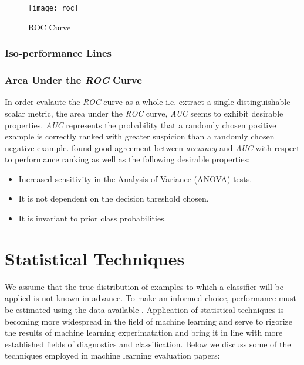 \documentclass[12pt]{unbthesis}
\begin{document}
\begin{figure}
  \begin{center}
	\texttt{[image: roc]}
  \end{center}
  \caption{ROC Curve}
  \label{fig:roc}
\end{figure} 


\subsubsection{Iso-performance Lines}

\subsubsection{Area Under the \textit{ROC} Curve}
In order evalaute the \textit{ROC} curve as a whole i.e. extract a
single distinguishable scalar metric, the area under the \textit{ROC}
curve, \textit{AUC} seems to exhibit desirable
properties. \textit{AUC} represents the probability that a randomly
chosen positive example is correctly ranked with greater suspicion
than a randomly chosen negative example. \cite{Refworks:32} found good
agreement between \textit{accuracy} and \textit{AUC} with respect to
performance ranking as well as the following desirable properties:

\begin{itemize}
\item Increased sensitivity in the Analysis of Variance (ANOVA) tests.
\item It is not dependent on the decision threshold chosen.
\item It is invariant to prior class probabilities.
\end{itemize}

\section{Statistical Techniques}
We assume that the true distribution of examples to which a classifier
will be applied is not known in advance. To make an informed choice,
performance must be estimated using the data available
\cite{RefWorks:45}. Application of statistical techniques is
becoming more widespread in the field of machine learning and serve to
rigorize the results of machine learning experimatation and bring it
in line with more established fields of diagnostics and
classification. Below we discuss some of the techniques employed in
machine learning evaluation papers:
\end{document}
